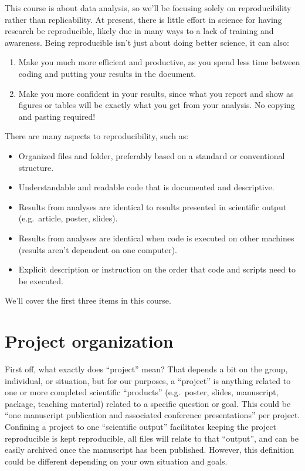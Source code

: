 \documentclass[]{Nemilov}
\providecommand{\tightlist}{%
  \setlength{\itemsep}{0pt}\setlength{\parskip}{0pt}}
\begin{document}
This course is about data analysis, so we'll be focusing solely on reproducibility
rather than replicability. At present, there is little effort in science for
having research be reproducible, likely due in many ways to a lack of training
and awareness. Being reproducible isn't just about doing better science, it
can also:

\begin{enumerate}
\def\labelenumi{\arabic{enumi}.}
\tightlist
\item
  Make you much more efficient and productive, as you spend less time between
  coding and putting your results in the document.
\item
  Make you more confident in your results, since what you report and show as
  figures or tables will be exactly what you get from your analysis. No copying
  and pasting required!
\end{enumerate}

There are many aspects to reproducibility, such as:

\begin{itemize}
\tightlist
\item
  Organized files and folder, preferably based on a standard or conventional structure.
\item
  Understandable and readable code that is documented and descriptive.
\item
  Results from analyses are identical to results presented in scientific output (e.g.~article, poster, slides).
\item
  Results from analyses are identical when code is executed on other machines (results aren't dependent on one computer).
\item
  Explicit description or instruction on the order that code and scripts need to be executed.
\end{itemize}

We'll cover the first three items in this course.

\hypertarget{r-reproducibility-projects}{%
\section{Project organization}\label{r-reproducibility-projects}}

First off, what exactly does ``project'' mean? That depends a bit on the group,
individual, or situation, but for our purposes, a ``project'' is anything related
to one or more completed scientific ``products'' (e.g.~poster, slides, manuscript,
package, teaching material) related to a specific question or goal. This could
be ``one manuscript publication and associated conference presentations'' per project.
Confining a project to one ``scientific output'' facilitates keeping the project reproducible
is kept reproducible, all files will relate to that ``output'', and can be easily
archived once the manuscript has been published. However, this definition could
be different depending on your own situation and goals.
\end{document}
